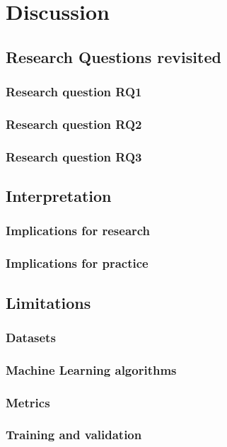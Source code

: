 \chapter{Discussion}
\section{Research Questions revisited}

\subsection{Research question RQ1}
\subsection{Research question RQ2}
\subsection{Research question RQ3}

\section{Interpretation}
\subsection{Implications for research}
\subsection{Implications for practice}

\section{Limitations}
\subsection{Datasets}
\subsection{Machine Learning algorithms}
\subsection{Metrics}
\subsection{Training and validation}
